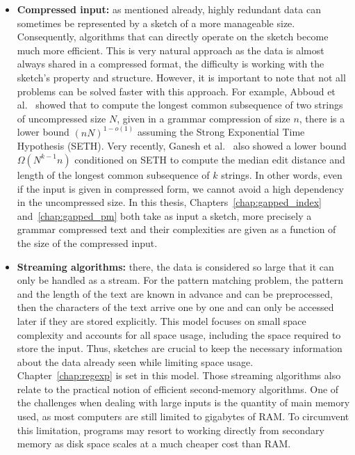 \begin{itemize}
\item \textbf{Compressed input:} as mentioned already, highly redundant data can sometimes be represented by a sketch of a more manageable size. 
Consequently, algorithms that can directly operate on the sketch become much more efficient. This is very natural approach as the data is almost always shared in a compressed format, the difficulty is working with the sketch's property and structure. However, it is important to note that not all problems can be solved faster with this approach. For example, Abboud et al.~\cite{abboud2017fine} showed that to compute the longest common subsequence of two strings of uncompressed size $N$, given in a grammar compression of size $n$, there is a lower bound $(nN)^{1-o(1)}$ assuming the Strong Exponential Time Hypothesis (SETH). 
Very recently, Ganesh et al.~\cite{ganesh2022compression} also showed a lower bound $\Omega(N^{k-1}n)$ conditioned on SETH to compute the median edit distance and length of the longest common subsequence of $k$ strings.
In other words, even if the input is given in compressed form, we cannot avoid a high dependency in the uncompressed size. In this thesis, Chapters~\ref{chap:gapped_index} and~\ref{chap:gapped_pm} both take as input a sketch, more precisely a grammar compressed text and their complexities are given as a function of the size of the compressed input.
%
\item \textbf{Streaming algorithms:} there, the data is considered so large that it can only be handled as a stream. %
For the pattern matching problem, the pattern and the length of the text are known in advance and can be preprocessed, then the characters of the text arrive one by one and can only be accessed later if they are stored explicitly. 
This model focuses on small space complexity and accounts for all space usage, including the space required to store the input.
Thus, sketches are crucial to keep the necessary information about the data already seen while limiting space usage.
Chapter~\ref{chap:regexp} is set in this model. %
Those streaming algorithms also relate to the practical notion of efficient second-memory algorithms. One of the challenges when dealing with large inputs is the quantity of main memory used, as most computers are still limited to gigabytes of RAM. To circumvent this limitation, programs may resort to working directly from secondary memory as disk space scales at a much cheaper cost than RAM.

\end{itemize}
